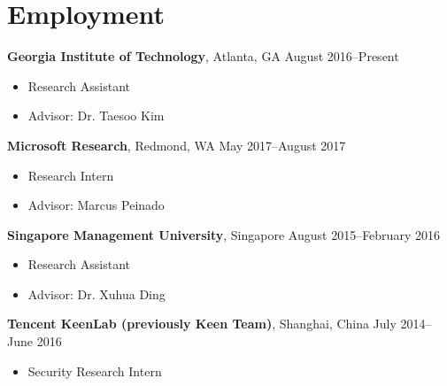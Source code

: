 \section*{Employment}

\begin{description}
\item {\bf Georgia Institute of Technology}, Atlanta, GA
\dotfill August 2016--Present
  \begin{itemize}
  \item Research Assistant
  \item Advisor: Dr. Taesoo Kim
  \end{itemize}
  
\item {\bf Microsoft Research}, Redmond, WA \dotfill May 2017--August 2017
  \begin{itemize}
  \item Research Intern
  \item Advisor: Marcus Peinado
  \end{itemize}

\item {\bf Singapore Management University}, Singapore \dotfill August 2015--February 2016
  \begin{itemize}
  \item Research Assistant
  \item Advisor: Dr. Xuhua Ding
  \end{itemize}

\item {\bf Tencent KeenLab (previously Keen Team)}, Shanghai, China \dotfill July 2014--June 2016
	\begin{itemize}
	\item Security Research Intern
	\end{itemize}
\end{description}

